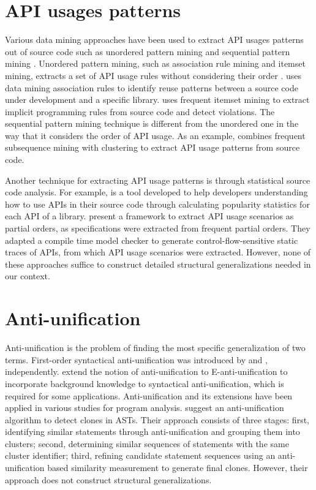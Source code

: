 \section{API usages patterns}  \label{ch7-usage-patterns}
Various data mining approaches have been used to extract API usages patterns out of source code such as unordered pattern mining and sequential pattern mining \cite{robillard2013automated}. Unordered pattern mining, such as association rule mining and itemset mining, extracts a set of API usage rules without considering their order \cite{agrawal1994fast}.  \cite{2000:icse:michail} uses data mining association rules to identify reuse patterns between a source code under development and a specific library.  \cite{li2005pr} uses frequent itemset mining to extract implicit programming rules from source code and detect violations. The sequential pattern mining technique is different from the unordered one in the way that it considers the order of API usage. As an example,  \cite{2006:msr:xie} combines frequent subsequence mining with clustering to extract API usage patterns from source code.

Another technique for extracting API usage patterns is through statistical source code analysis. For example,  \cite{holmes2008newbie} is a tool developed to help developers understanding how to use APIs in their source code through calculating popularity statistics for each API of a library. \citet{acharya2007mining} present a framework to extract API usage scenarios as partial orders, as specifications were extracted from frequent partial orders. They adapted a compile time model checker to generate control-flow-sensitive static traces of APIs, from which API usage scenarios were extracted. However, none of these approaches suffice to construct detailed structural generalizations needed in our context.
\section{Anti-unification}  \label{ch7-au}
Anti-unification is the problem of finding the most specific generalization of two terms. First-order syntactical anti-unification was introduced by \citet{plotkin1970note} and \citet{reynolds1970transformational}, independently. \citet{burghardt1996implementing} extend the notion of anti-unification to E-anti-unification to incorporate background knowledge to syntactical anti-unification, which is required for some applications. Anti-unification and its extensions have been applied in various studies for program analysis. \citet{bulychev2009evaluation} suggest an anti-unification algorithm to detect clones in ASTs. Their approach consists of three stages: first, identifying similar statements through anti-unification and grouping them into clusters; second, determining similar sequences of statements with the same cluster identifier; third, refining candidate statement sequences using an anti-unification based similarity measurement to generate final clones. However, their approach does not construct structural generalizations.

